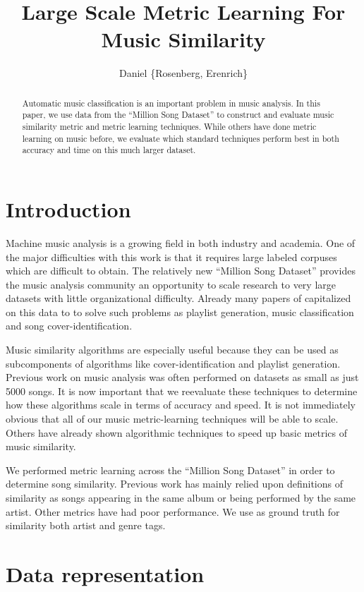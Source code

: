\documentclass[a4paper,10pt]{article}
\title{Large Scale Metric Learning For Music Similarity}
\author{Daniel \{Rosenberg, Erenrich\} }
\begin{document}
\maketitle

\begin{abstract}
Automatic music classification is an important problem in music analysis. In this paper, we use data from the ``Million Song Dataset'' to construct and evaluate music similarity metric and metric learning techniques. While others have done metric learning on music before, we evaluate which standard techniques perform best in both accuracy and time on this much larger dataset.
\end{abstract}

\section{Introduction}
Machine music analysis is a growing field in both industry and academia. One of the major difficulties with this work is that it requires large labeled corpuses which are difficult to obtain. The relatively new ``Million Song Dataset'' provides the music analysis community an opportunity to scale research to very large datasets with little organizational difficulty\cite{Bertin-Mahieux2011}. Already many papers of capitalized on this data to to solve such problems as playlist generation\cite{mcfee2011_nlp}, music classification and song cover-identification\cite{Bertin-Mahieux2011b}. 

Music similarity algorithms are especially useful because they can be used as subcomponents of algorithms like cover-identification and playlist generation. Previous work on music analysis was often performed on datasets as small as just 5000 songs\cite{Slaney_learninga}. It is now important that we reevaluate these techniques to determine how these algorithms scale in terms of accuracy and speed. It is not immediately obvious that all of our music metric-learning techniques will be able to scale. Others have already shown algorithmic techniques to speed up basic metrics of music similarity\cite{mcfee2011_sim}.

We performed metric learning across the ``Million Song Dataset'' in order to determine song similarity. Previous work has mainly relied upon definitions of similarity as songs appearing in the same album or being performed by the same artist. Other metrics have had poor performance. We use as ground truth for similarity both artist and genre tags.
\section{Data representation}
\end{document}

